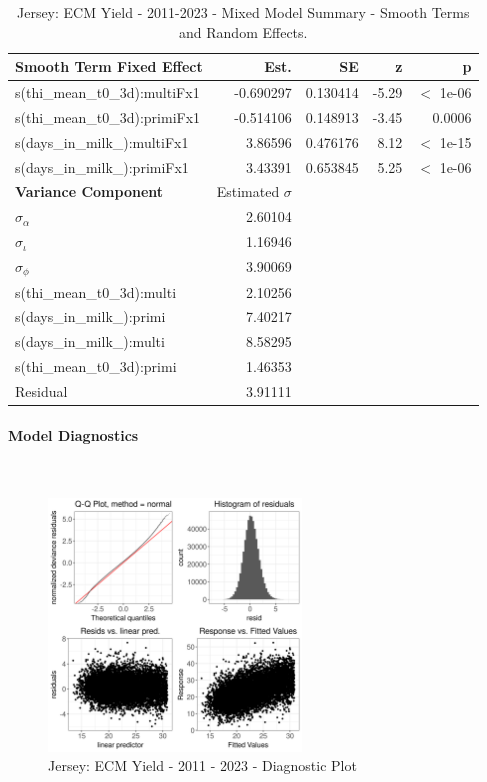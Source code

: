 \newpage
\begin{table}[H]
\centering
\begin{tabular}
{l | r | r | r | r}
\textbf{Smooth Term Fixed Effect} & Est. & SE & z & p\\
\hline
\hline
s(thi\_mean\_t0\_3d):multiFx1 & -0.690297 & 0.130414 & -5.29 & $<$ 1e-06\\
s(thi\_mean\_t0\_3d):primiFx1 & -0.514106 & 0.148913 & -3.45 & 0.0006 \\
s(days\_in\_milk\_):multiFx1 & 3.86596 & 0.476176 & 8.12 & $<$ 1e-15\\
s(days\_in\_milk\_):primiFx1 & 3.43391 & 0.653845 & 5.25 & $<$ 1e-06\\
\hline
\textbf{Variance Component} & Estimated $\sigma$ & & & \\
\hline
\hline
$\sigma_\alpha$ & 2.60104 & &  & \\
$\sigma_\iota$ & 1.16946 & & & \\
$\sigma_\phi$ & 3.90069 & & & \\
s(thi\_mean\_t0\_3d):multi & 2.10256 & & & \\
s(days\_in\_milk\_):primi & 7.40217 & & & \\
s(days\_in\_milk\_):multi & 8.58295 & & & \\
s(thi\_mean\_t0\_3d):primi & 1.46353 & & & \\
Residual & 3.91111 & & & \\
\end{tabular}
\caption[]{Jersey: ECM Yield - 2011-2023 - Mixed Model Summary - Smooth Terms and Random Effects.}
\end{table}



\paragraph{Model Diagnostics} \quad \\
\begin{figure}[H]
    \centering
    \includegraphics[width=0.6\textwidth]{thesis/figures/models/ecm/after2010/je_ecm_after2010/je_ecm_after2010_diagnostics.png}
    \caption[]{Jersey: ECM Yield - 2011 - 2023 - Diagnostic Plot}
\end{figure}

